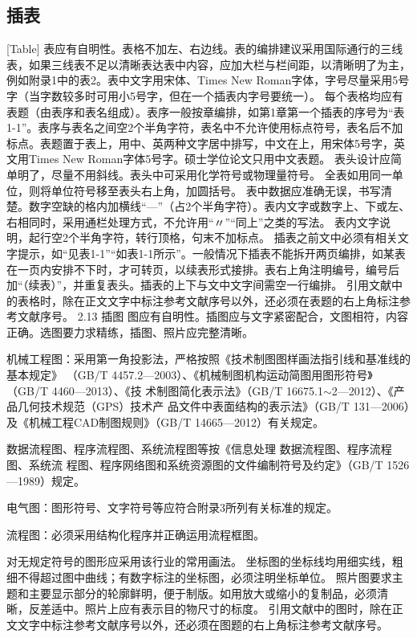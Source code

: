 \subsection{插表}[Table]
表应有自明性。表格不加左、右边线。表的编排建议采用国际通行的三线表，如果三线表不足以清晰表达表中内容，应加大栏与栏间距，以清晰明了为主，例如附录1中的表2。表中文字用宋体、Times New Roman字体，字号尽量采用5号字（当字数较多时可用小5号字，但在一个插表内字号要统一）。
每个表格均应有表题（由表序和表名组成）。表序一般按章编排，如第1章第一个插表的序号为“表1-1”。表序与表名之间空2个半角字符，表名中不允许使用标点符号，表名后不加标点。表题置于表上，用中、英两种文字居中排写，中文在上，用宋体5号字，英文用Times New Roman字体5号字。硕士学位论文只用中文表题。
表头设计应简单明了，尽量不用斜线。表头中可采用化学符号或物理量符号。
全表如用同一单位，则将单位符号移至表头右上角，加圆括号。
表中数据应准确无误，书写清楚。数字空缺的格内加横线“—”（占2个半角字符）。表内文字或数字上、下或左、右相同时，采用通栏处理方式，不允许用“〃”“同上”之类的写法。
表内文字说明，起行空2个半角字符，转行顶格，句末不加标点。
插表之前文中必须有相关文字提示，如“见表1-1”“如表1-1所示”。一般情况下插表不能拆开两页编排，如某表在一页内安排不下时，才可转页，以续表形式接排。表右上角注明编号，编号后加“（续表）”，并重复表头。插表的上下与文中文字间需空一行编排。
引用文献中的表格时，除在正文文字中标注参考文献序号以外，还必须在表题的右上角标注参考文献序号。
2.13  插图
图应有自明性。插图应与文字紧密配合，文图相符，内容正确。选图要力求精练，插图、照片应完整清晰。

机械工程图：采用第一角投影法，严格按照《技术制图图样画法指引线和基准线的基本规定》
（GB/T 4457.2—2003）、《机械制图机构运动简图用图形符号》（GB/T 4460—2013）、《技
术制图简化表示法》（GB/T 16675.1$\sim$2—2012）、《产品几何技术规范（GPS）技术产
品文件中表面结构的表示法》（GB/T 131—2006）及《机械工程CAD制图规则》（GB/T
14665—2012）有关规定。

数据流程图、程序流程图、系统流程图等按《信息处理 数据流程图、程序流程图、系统流
程图、程序网络图和系统资源图的文件编制符号及约定》（GB/T 1526—1989）规定。

电气图：图形符号、文字符号等应符合附录3所列有关标准的规定。

流程图：必须采用结构化程序并正确运用流程框图。

对无规定符号的图形应采用该行业的常用画法。
坐标图的坐标线均用细实线，粗细不得超过图中曲线；有数字标注的坐标图，必须注明坐标单位。
照片图要求主题和主要显示部分的轮廓鲜明，便于制版。如用放大或缩小的复制品，必须清
晰，反差适中。照片上应有表示目的物尺寸的标度。
引用文献中的图时，除在正文文字中标注参考文献序号以外，还必须在图题的右上角标注参考文献序号。

